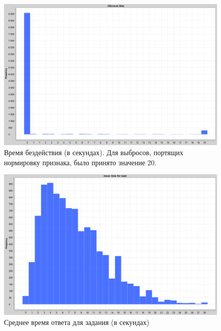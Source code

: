 \documentclass[specification,annotation,times]{itmo-student-thesis}
\begin{document}
\begin{figure}
  \includegraphics[scale=0.5]{idleness_time.PNG}
  \caption{Время бездействия (в секундах). Для выбросов, портящих нормировку признака, было принято значение 20.}
  \label{fig:idleness_time}
\end{figure}

\begin{figure}
  \includegraphics[scale=0.5]{mean_time_for_task.PNG}
  \caption{Среднее время ответа для задания (в секундах)}
  \label{fig:mean_time_for_task}
\end{figure}
\end{document}
